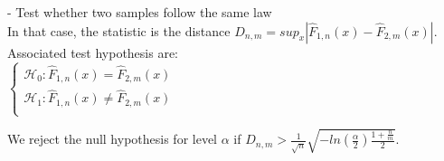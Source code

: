 - Test whether two samples follow the same law \\

In that case, the statistic is the distance $D_{n,m} = sup_x |\widehat{F}_{1,n}(x) - \widehat{F}_{2,m}(x)|$. \\

Associated test hypothesis are: \\

$
\left\{
    \begin{array}{ll}
        \mathcal{H}_0: \widehat{F}_{1,n}(x) = \widehat{F}_{2,m}(x) \\
        \mathcal{H}_1: \widehat{F}_{1,n}(x) \neq \widehat{F}_{2,m}(x) \\
    \end{array}
\right.
$

We reject the null hypothesis for level $\alpha$ if $D_{n,m} > \frac{1}{\sqrt{n}} \sqrt{-ln(\frac{\alpha}{2}) \frac{1 + \frac{n}{m}}{2}}$.

\vspace{5mm}